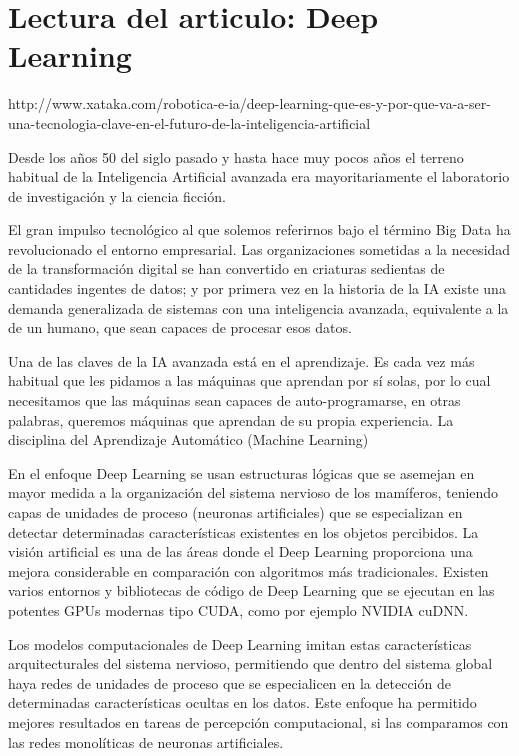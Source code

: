 \documentclass[a4paper,12pt]{article}
\begin{document}
\section{Lectura del articulo: Deep Learning}
\justifying
\par
http://www.xataka.com/robotica-e-ia/deep-learning-que-es-y-por-que-va-a-ser-una-tecnologia-clave-en-el-futuro-de-la-inteligencia-artificial
\par
Desde los años 50 del siglo pasado y hasta hace muy pocos años el terreno habitual de la Inteligencia Artificial avanzada era mayoritariamente el laboratorio de investigación y la ciencia ficción.
\par
El gran impulso tecnológico al que solemos referirnos bajo el término Big Data ha revolucionado el entorno empresarial. Las organizaciones sometidas a la necesidad de la transformación digital se han convertido en criaturas sedientas de cantidades ingentes de datos; y por primera vez en la historia de la IA existe una demanda generalizada de sistemas con una inteligencia avanzada, equivalente a la de un humano, que sean capaces de procesar esos datos.
\par
Una de las claves de la IA avanzada está en el aprendizaje. Es cada vez más habitual que les pidamos a las máquinas que aprendan por sí solas, por lo cual necesitamos que las máquinas sean capaces de auto-programarse, en otras palabras, queremos máquinas que aprendan de su propia experiencia. La disciplina del Aprendizaje Automático (Machine Learning)
\par
En el enfoque Deep Learning se usan estructuras lógicas que se asemejan en mayor medida a la organización del sistema nervioso de los mamíferos, teniendo capas de unidades de proceso (neuronas artificiales) que se especializan en detectar determinadas características existentes en los objetos percibidos. La visión artificial es una de las áreas donde el Deep Learning proporciona una mejora considerable en comparación con algoritmos más tradicionales. Existen varios entornos y bibliotecas de código de Deep Learning que se ejecutan en las potentes GPUs modernas tipo CUDA, como por ejemplo NVIDIA cuDNN.
\par
Los modelos computacionales de Deep Learning imitan estas características arquitecturales del sistema nervioso, permitiendo que dentro del sistema global haya redes de unidades de proceso que se especialicen en la detección de determinadas características ocultas en los datos. Este enfoque ha permitido mejores resultados en tareas de percepción computacional, si las comparamos con las redes monolíticas de neuronas artificiales.
\end{document}
